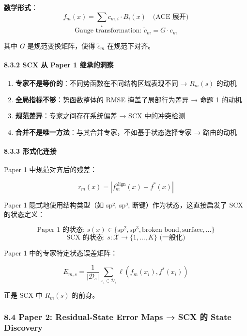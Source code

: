 \documentclass[
  12pt,
]{ctexart}
\providecommand{\tightlist}{%
  \setlength{\itemsep}{0pt}\setlength{\parskip}{0pt}}
\begin{document}
\textbf{数学形式}： \[
f_m(x) = \sum_{i} c_{m,i} \cdot B_i(x) \quad \text{(ACE 展开)}
\] \[
\text{Gauge transformation: } \tilde{c}_m = G \cdot c_m
\]

其中 \(G\) 是规范变换矩阵，使得 \(\tilde{c}_m\) 在规范下对齐。

\paragraph{8.3.2 SCX 从 Paper 1
继承的洞察}\label{scx-ux4ece-paper-1-ux7ee7ux627fux7684ux6d1eux5bdf}

\begin{enumerate}
\def\labelenumi{\arabic{enumi}.}
\tightlist
\item
  \textbf{专家不是等价的}：不同势函数在不同结构区域表现不同 → \(R_m(s)\)
  的动机
\item
  \textbf{全局指标不够}：势函数整体的 RMSE 掩盖了局部行为差异 → 命题 1
  的动机
\item
  \textbf{规范差异}：专家之间存在系统偏差 → SCX 中的冲突检测
\item
  \textbf{合并不是唯一方法}：与其合并专家，不如基于状态选择专家 →
  路由的动机
\end{enumerate}

\paragraph{8.3.3 形式化连接}\label{ux5f62ux5f0fux5316ux8fdeux63a5}

Paper 1 中规范对齐后的残差：

\[
r_m(x) = |f_m^{\text{align}}(x) - f^*(x)|
\]

Paper 1 隐式地使用结构类型（如 sp², sp³, 断键）作为状态，这直接启发了
SCX 的状态定义：

\[
\text{Paper 1 的状态: } s(x) \in \{\text{sp}^2, \text{sp}^3, \text{broken bond}, \text{surface}, \dots\}
\] \[
\text{SCX 的状态: } s: \mathcal{X} \to \{1, \dots, K\} \text{ (一般化)}
\]

Paper 1 中的专家特定状态误差矩阵：

\[
E_{m,s} = \frac{1}{|\mathcal{D}_s|} \sum_{x_i \in \mathcal{D}_s} \ell(f_m(x_i), f^*(x_i))
\]

正是 SCX 中 \(R_m(s)\) 的前身。

\subsubsection{8.4 Paper 2: Residual-State Error Maps → SCX 的 State
Discovery}\label{paper-2-residual-state-error-maps-scx-ux7684-state-discovery}
\end{document}
